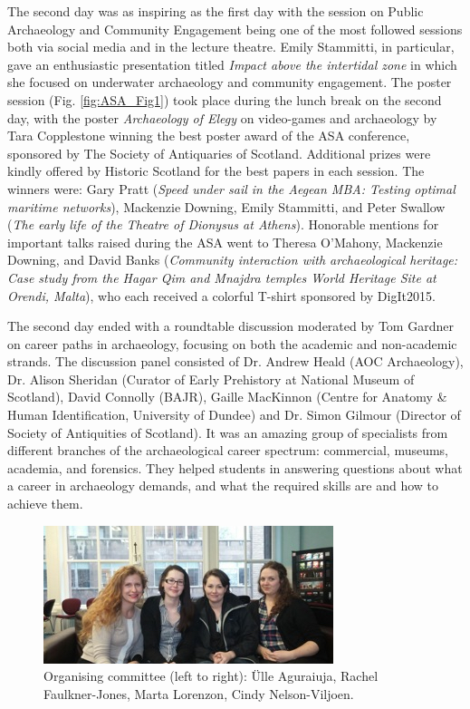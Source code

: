 	The second day was as inspiring as the first day with the session on Public Archaeology and Community Engagement being one of the most followed sessions both via social media and in the lecture theatre. Emily Stammitti, in particular, gave an enthusiastic presentation titled \textit{Impact above the intertidal zone} in which she focused on underwater archaeology and community engagement. The poster session (Fig. \ref{fig:ASA_Fig1}) took place during the lunch break on the second day, with the poster \textit{Archaeology of Elegy} on video-games and archaeology by Tara Copplestone winning the best poster award of the  ASA conference, sponsored by The Society of Antiquaries of Scotland. Additional prizes were kindly offered by Historic Scotland for the best papers in each session. The winners were: Gary Pratt (\textit{Speed under sail in the Aegean MBA: Testing optimal maritime networks}), Mackenzie Downing, Emily Stammitti, and Peter Swallow (\textit{The early life of the Theatre of Dionysus at Athens}). Honorable mentions for important talks raised during the  ASA went to Theresa O'Mahony, Mackenzie Downing, and David Banks (\textit{Community interaction with archaeological heritage: Case study from the Hagar Qim and Mnajdra temples World Heritage Site at Orendi, Malta}), who each received a colorful T-shirt sponsored by DigIt2015.
	

The second day ended with a roundtable discussion moderated by Tom Gardner on career paths in archaeology, focusing on both the academic and non-academic strands. The discussion panel consisted of Dr. Andrew Heald (AOC Archaeology), Dr. Alison Sheridan (Curator of Early Prehistory at National Museum of Scotland), David Connolly (BAJR), Gaille MacKinnon (Centre for Anatomy \& Human Identification, University of Dundee) and Dr. Simon Gilmour (Director of Society of Antiquities of Scotland). It was an amazing group of specialists from different branches of the archaeological career spectrum: commercial, museums, academia, and forensics. They helped students in answering questions about what a career in archaeology demands, and what the required skills are and how to achieve them.

\begin{figure}%
	\includegraphics[width=\linewidth]{figures/ASA_Fig2}
	\caption{Organising committee (left to right): Ülle Aguraiuja, Rachel Faulkner-Jones, Marta Lorenzon, Cindy Nelson-Viljoen.}
	\label{fig:ASA_Fig2}
\end{figure}	

